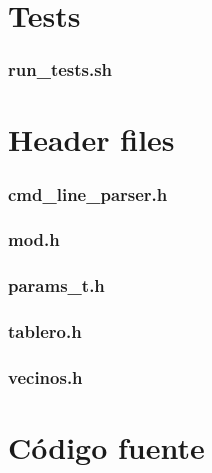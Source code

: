\documentclass[a4paper,12pt]{article}
\numberwithin{equation}{section}
\numberwithin{figure}{section}
\begin{document}
	\section{Tests}\label{appendix_tests}
	
	\subsubsection{run\_tests.sh}\label{app_run_tests}
	
	
	\clearpage
	\section{Header files}\label{appendix_headers}
	
	\subsubsection{cmd\_line\_parser.h}\label{app_cmd_line_parser_h}
	
	\clearpage
	
	\subsubsection{mod.h}\label{app_mod_h}
	
	\clearpage
	
	\subsubsection{params\_t.h}\label{app_params_t_h}
	
	\clearpage
	
	\subsubsection{tablero.h}\label{app_tablero_h}
	
	\clearpage
	
	\subsubsection{vecinos.h}\label{app_vecinos_h}
	
	\clearpage
	
	
	\clearpage
	\section{Código fuente}\label{appendix_codigo_fuente}
	
\end{document}
